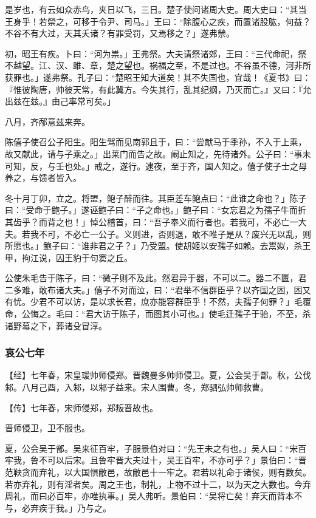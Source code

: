 \documentclass[]{article}
\begin{document}
是岁也，有云如众赤鸟，夹日以飞，三日。楚子使问诸周大史。周大史曰：``其当王身乎！若禜之，可移于令尹、司马。」王曰：``除腹心之疾，而置诸股肱，何益？不谷不有大过，天其夭诸？有罪受罚，又焉移之？」遂弗禜。

初，昭王有疾。卜曰：``河为祟。」王弗祭。大夫请祭诸郊，王曰：``三代命祀，祭不越望。江、汉、雎、章，楚之望也。祸福之至，不是过也。不谷虽不德，河非所获罪也。」遂弗祭。孔子曰：``楚昭王知大道矣！其不失国也，宜哉！《夏书》曰：『惟彼陶唐，帅彼天常，有此冀方。今失其行，乱其纪纲，乃灭而亡。』又曰：『允出兹在兹。』由己率常可矣。」

八月，齐邴意兹来奔。

陈僖子使召公子阳生。阳生驾而见南郭且于，曰：``尝献马于季孙，不入于上乘，故又献此，请与子乘之。」出莱门而告之故。阚止知之，先待诸外。公子曰：``事未可知，反，与壬也处。」戒之，遂行。逮夜，至于齐，国人知之。僖子使子士之母养之，与馈者皆入。

冬十月丁卯，立之。将盟，鲍子醉而往。其臣差车鲍点曰：``此谁之命也？」陈子曰：``受命于鲍子。」遂诬鲍子曰：``子之命也。」鲍子曰：``女忘君之为孺子牛而折其齿乎？而背之也！」悼公稽首，曰：``吾子奉义而行者也。若我可，不必亡一大夫。若我不可，不必亡一公子。义则进，否则退，敢不唯子是从？废兴无以乱，则所愿也。」鲍子曰：``谁非君之子？」乃受盟。使胡姬以安孺子如赖。去鬻姒，杀王甲，拘江说，囚王豹于句窦之丘。

公使朱毛告于陈子，曰：``微子则不及此。然君异于器，不可以二。器二不匮，君二多难，敢布诸大夫。」僖子不对而泣，曰：``君举不信群臣乎？以齐国之困，困又有忧。少君不可以访，是以求长君，庶亦能容群臣乎！不然，夫孺子何罪？」毛覆命，公悔之。毛曰：``君大访于陈子，而图其小可也。」使毛迁孺子于骀，不至，杀诸野幕之下，葬诸殳冒淳。

\hypertarget{header-n3109}{%
\subsubsection{哀公七年}\label{header-n3109}}

【经】七年春，宋皇瑗帅师侵郑。晋魏曼多帅师侵卫。夏，公会吴于鄫。秋，公伐邾。八月己酉，入邾，以邾子益来。宋人围曹。冬，郑驷弘帅师救曹。

【传】七年春，宋师侵郑，郑叛晋故也。

晋师侵卫，卫不服也。

夏，公会吴于鄫。吴来征百牢，子服景伯对曰：``先王未之有也。」吴人曰：``宋百牢我，鲁不可以后宋。且鲁牢晋大夫过十，吴王百牢，不亦可乎？」景伯曰：``晋范鞅贪而弃礼，以大国惧敝邑，故敝邑十一牢之。君若以礼命于诸侯，则有数矣。若亦弃礼，则有淫者矣。周之王也，制礼，上物不过十二，以为天之大数也。今弃周礼，而曰必百牢，亦唯执事。」吴人弗听。景伯曰：``吴将亡矣！弃天而背本不与，必弃疾于我。」乃与之。
\end{document}
